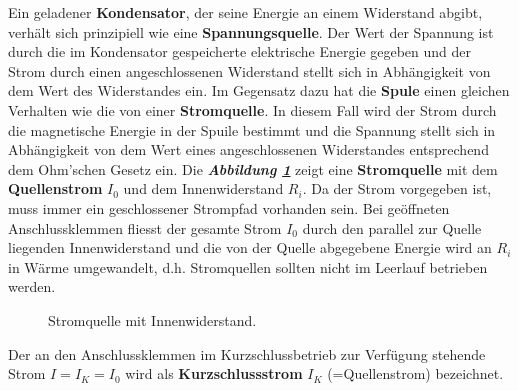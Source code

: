 \newline\newline
Ein geladener \textbf{Kondensator}, der seine Energie an einem Widerstand abgibt, verhält sich prinzipiell wie eine \textbf{Spannungsquelle}. Der Wert der Spannung ist durch die im Kondensator gespeicherte elektrische Energie gegeben und der Strom durch einen angeschlossenen Widerstand stellt sich in Abhängigkeit von dem Wert des Widerstandes ein.
\newline\newline
Im Gegensatz dazu hat die \textbf{Spule} einen gleichen Verhalten wie die von einer \textbf{Stromquelle}. In diesem Fall wird der Strom durch die magnetische Energie in der Spuile bestimmt und die Spannung stellt sich in Abhängigkeit von dem Wert eines angeschlossenen Widerstandes entsprechend dem Ohm'schen Gesetz ein.
\newline\newline
Die \textbf{\textit{Abbildung \ref{fig_IIIw}}} zeigt eine \textbf{Stromquelle} mit dem \textbf{Quellenstrom} $I_0$ und dem Innenwiderstand $R_i$. Da der Strom vorgegeben ist, muss immer ein geschlossener Strompfad vorhanden sein. Bei geöffneten Anschlussklemmen fliesst der gesamte Strom $I_0$ durch den parallel zur Quelle liegenden Innenwiderstand und die von der Quelle abgegebene Energie wird an $R_i$ in Wärme umgewandelt, d.h. Stromquellen sollten nicht im Leerlauf betrieben werden. 
\begin{figure}[H]
\centering
\caption{Stromquelle mit Innenwiderstand.}
\label{fig_IIIw}
\end{figure}
\noindent Der an den Anschlussklemmen im Kurzschlussbetrieb zur Verfügung stehende Strom $I=I_K=I_0$ wird als \textbf{Kurzschlussstrom} $I_K$ (=Quellenstrom) bezeichnet.
